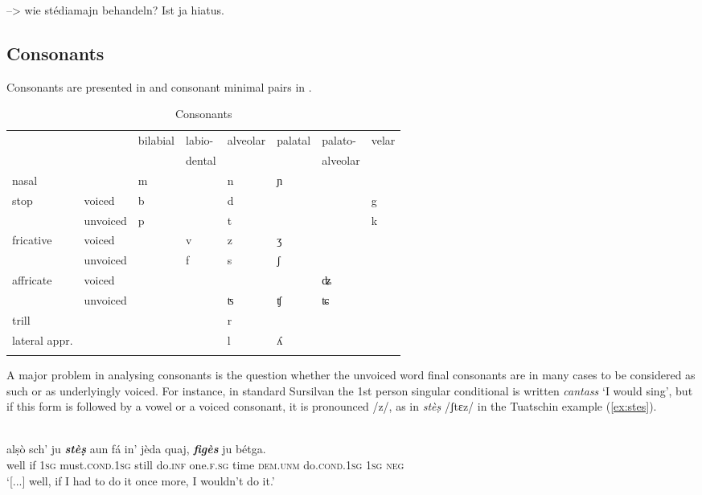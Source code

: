 --> wie stédiamajn behandeln? Ist ja hiatus.
 
\subsection{Consonants}
Consonants are presented in  and consonant minimal pairs in .

\begin{table}
\caption{Consonants}
\label{cons}
 \begin{tabular}{llllllll}
  \lsptoprule
      &  & bilabial & labio-  & alveolar  &  palatal & palato- &velar\\
     &&& dental &&& alveolar \\
  \midrule
nasal    &    &  m   & &  n       &  	ɲ & \\

stop &voiced   &  b  &   &  d     &  &  & g\\
  & unvoiced   &  p   &      & t  &  & & k\\
fricative  &  voiced  &      & v        & z &  	ʒ\\
  &  unvoiced  &      &   f      & s & ʃ\\
  affricate & voiced & & & &&ʥ \\
  & unvoiced &&&ʦ & ʧ &ʨ\\
trill  &    &      &         & r \\
lateral appr.  &    &      &         & l & ʎ \\
  \lspbottomrule
 \end{tabular}
\end{table}

A major problem in analysing consonants is the question whether the unvoiced word final consonants are in many cases to be considered as such or as underlyingly voiced. For instance, in standard Sursilvan the 1st person singular conditional is written \textit{cantass} `I would sing', but if this form is followed by a vowel or a voiced consonant, it is pronounced /z/, as in \textit{stèṣ} /ʃtɛz/ in the Tuatschin example (\ref{ex:stes}).

\ea\label{ex:stes}
\\
\gll [...] alṣò sch' ju \textit{\textbf{stèṣ}} aun fá in' jèda quaj, \textit{\textbf{figès}} ju bétga.\\
{} well if \textsc{1sg} must.\textsc{cond.1sg} still do.\textsc{inf} one.\textsc{f.sg} time \textsc{dem.unm} do.\textsc{cond.1sg} \textsc{1sg} \textsc{neg}\\
\glt `[...] well, if I had to do it once more, I wouldn't do it.'
\z

